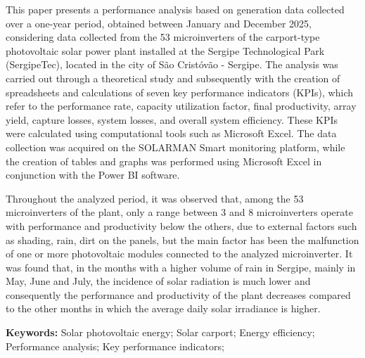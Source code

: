 This paper presents a performance analysis based on generation data collected over a one-year period, obtained between January and December 2025, considering data collected from the 53 microinverters of the carport-type photovoltaic solar power plant installed at the Sergipe Technological Park (SergipeTec), located in the city of São Cristóvão - Sergipe. The analysis was carried out through a theoretical study and subsequently with the creation of spreadsheets and calculations of seven key performance indicators (KPIs), which refer to the performance rate, capacity utilization factor, final productivity, array yield, capture losses, system losses, and overall system efficiency. These KPIs were calculated using computational tools such as Microsoft Excel. The data collection was acquired on the SOLARMAN Smart monitoring platform, while the creation of tables and graphs was performed using Microsoft Excel in conjunction with the Power BI software.

Throughout the analyzed period, it was observed that, among the 53 microinverters of the plant, only a range between 3 and 8 microinverters operate with performance and productivity below the others, due to external factors such as shading,
rain, dirt on the panels, but the main factor has been the malfunction of one or more photovoltaic modules connected to the analyzed microinverter. It was found that, in the months with a higher volume of rain in Sergipe, mainly in May, June and July, the incidence of solar radiation is much lower and consequently the performance and productivity of the plant decreases compared to the other months in which the average daily solar irradiance is higher.

\noindent\textbf{Keywords:} Solar photovoltaic energy; Solar carport; Energy efficiency; Performance analysis; Key performance indicators;